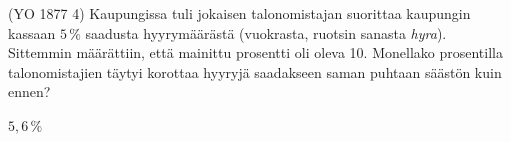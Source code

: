\begin{tehtavasivu}
\begin{tehtava}
    (YO 1877 4) Kaupungissa tuli jokaisen talonomistajan suorittaa kaupungin kassaan $5\,\%$ saadusta
    hyyrymäärästä (vuokrasta, ruotsin sanasta \textit{hyra}). Sittemmin määrättiin, että mainittu
    prosentti oli oleva 10. Monellako prosentilla talonomistajien täytyi korottaa hyyryjä
    saadakseen saman puhtaan säästön kuin ennen?
    \begin{vastaus}
        $5,6\,\%$
    \end{vastaus}
\end{tehtava}


\end{tehtavasivu}
